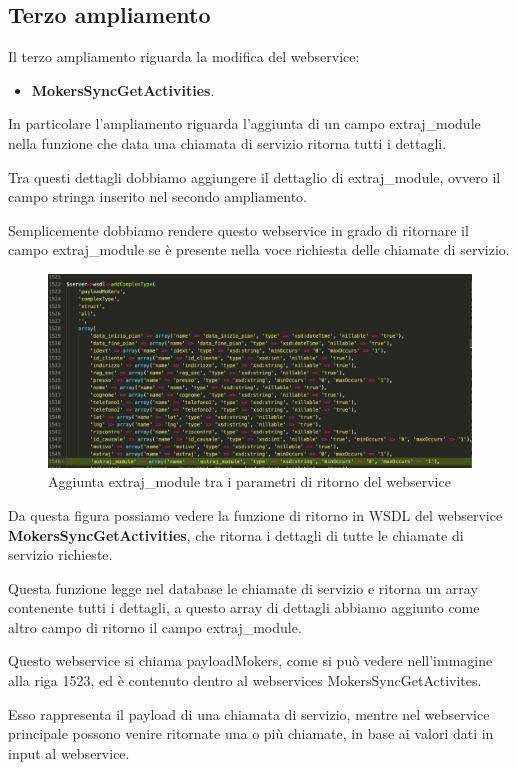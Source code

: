 \subsection{Terzo ampliamento}
Il terzo ampliamento riguarda la modifica del webservice:
\begin{itemize}
	\item \textbf{MokersSyncGetActivities}.
\end{itemize}
\begin{flushleft}
	
	In particolare l'ampliamento riguarda l'aggiunta di un campo extraj\_module nella funzione che data una chiamata di servizio ritorna tutti i dettagli.
	
	Tra questi dettagli dobbiamo aggiungere il dettaglio di extraj\_module, ovvero il campo stringa inserito nel secondo ampliamento.
	
	Semplicemente dobbiamo rendere questo webservice in grado di ritornare il campo extraj\_module se è presente nella voce richiesta delle chiamate di servizio.
	
\end{flushleft}
\newspace
\begin{figure}[!h] 
	\centering
	\includegraphics[scale = 0.3]{immagini/webservices/ampliamenti/3ampl__types_getCisa.png}
	\caption{Aggiunta extraj\_module tra i parametri di ritorno del webservice}
\end{figure}
\newspace
\begin{flushleft}
	Da questa figura possiamo vedere la funzione di ritorno in WSDL del webservice \textbf{MokersSyncGetActivities}, che ritorna i dettagli di tutte le chiamate di servizio richieste. 
	\newspace
	
	Questa funzione legge nel database le chiamate di servizio e ritorna un array contenente tutti i dettagli, a questo array di dettagli abbiamo aggiunto come altro campo di ritorno il campo extraj\_module.
	
	\newspace
	
	Questo webservice si chiama payloadMokers, come si può vedere nell'immagine alla riga 1523, ed è contenuto dentro al webservices MokersSyncGetActivites.
	\newspace
	
	Esso rappresenta il payload di una chiamata di servizio, mentre nel webservice principale possono venire ritornate una o più chiamate, in base ai valori dati in input al webservice.
\end{flushleft}


